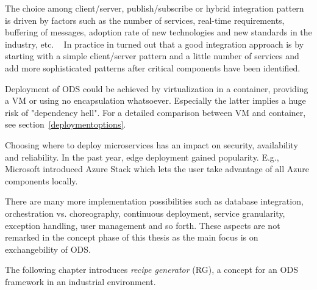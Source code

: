 The choice among client/server, publish/subscribe or hybrid integration pattern is driven by factors such as the number of services, real-time requirements, buffering of messages, adoption rate of new technologies and new standards in the industry, etc. ~\cite{Bianco2007EvaluatingArchitecture} In practice in turned out that a good integration approach is by starting with a simple client/server pattern and a little number of services and add more sophisticated patterns after critical components have been identified.~\cite{Newman2015BuildingMicroservices}

Deployment of ODS could be achieved by virtualization in a container, providing a VM or using no encapsulation whatsoever. Especially the latter implies a huge risk of "dependency hell". For a detailed comparison between VM and container, see section~\ref{deploymentoptions}.

Choosing where to deploy microservices has an impact on security, availability and reliability. In the past year, edge deployment gained popularity. E.g., Microsoft introduced Azure Stack which lets the user take advantage of all Azure components locally.~\cite{Azure-Documentation2019Was2019}

There are many more implementation possibilities such as database integration, orchestration vs. choreography, continuous deployment, service granularity, exception handling, user management and so forth. These aspects are not remarked in the concept phase of this thesis as the main focus is on exchangebility of ODS.

The following chapter introduces \textit{recipe generator} (RG), a concept for an ODS framework in an industrial environment.
